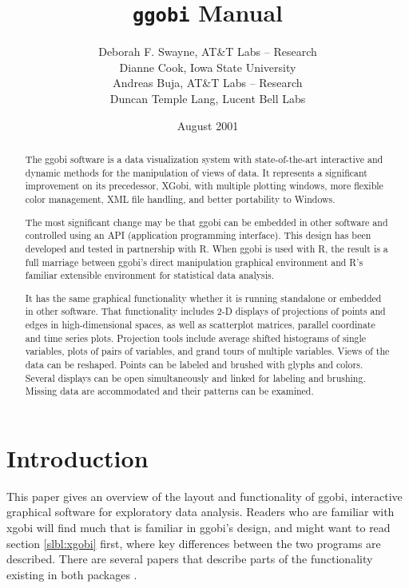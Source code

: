 \documentclass[11pt]{article}
\begin{document}
\title {{\tt ggobi} Manual}
\author{
Deborah F. Swayne, AT\&T Labs -- Research \\
Dianne Cook, Iowa State University \\
Andreas Buja, AT\&T Labs -- Research \\
Duncan Temple Lang, Lucent Bell Labs
}
\date{August 2001}

\maketitle

\begin{abstract}

The ggobi software is a data visualization system with state-of-the-art
interactive and dynamic methods for the manipulation of views of
data.  It represents a significant improvement on its precedessor, XGobi,
with multiple plotting windows, more flexible color management, XML file
handling, and better portability to Windows.

The most significant change may be that ggobi can be embedded in other
software and controlled using an API (application programming
interface).  This design has been developed and tested in partnership
with R.  When ggobi is used with R, the result is a full marriage
between ggobi's direct manipulation graphical environment and R's
familiar extensible environment for statistical data analysis.

It has the same graphical functionality whether it is running
standalone or embedded in other software.  That functionality
includes 2-D displays of projections of points and edges in
high-dimensional spaces, as well as scatterplot matrices, parallel
coordinate and time series plots.  Projection tools include average
shifted histograms of single variables, plots of pairs of variables,
and grand tours of multiple variables.  Views of the data can be
reshaped.  Points can be labeled and brushed with glyphs and colors.
Several displays can be open simultaneously and linked for labeling
and brushing.  Missing data are accommodated and their patterns can
be examined.
\end{abstract}

\section{Introduction}

This paper gives an overview of the layout and functionality of ggobi,
interactive graphical software for exploratory data analysis.  Readers
who are familiar with xgobi will find much that is familiar in ggobi's
design, and might want to read section \ref{slbl:xgobi} first, where
key differences between the two programs are described. There are
several papers that describe parts of the functionality existing in
both packages
\cite{BCS95,SCB97,SB98,BAHM88,CBC93,CBCH95,CB95,BCAH95c}.
\end{document}
